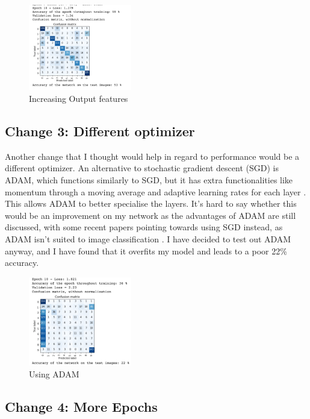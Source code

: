 \documentclass{article}
\begin{document}
    \begin{figure}[h!]
        \centering
        \includegraphics[width=0.4\textwidth]{bigger_output}
        \caption{Increasing Output features}
    \end{figure}

    \subsection{Change 3: Different optimizer}

    Another change that I thought would help in regard to performance would be a different optimizer. An alternative to stochastic gradient descent (SGD) is ADAM, which functions similarly to SGD, but it has extra functionalities like momentum through a moving average and adaptive learning rates for each layer \cite{adam}. This allows ADAM to better specialise the layers. It's hard to say whether this would be an improvement on my network as the advantages of ADAM are still discussed, with some recent papers pointing towards using SGD instead, as ADAM isn't suited to image classification \cite{adamvssgd}. I have decided to test out ADAM anyway, and I have found that it overfits my model and leads to a poor 22\% accuracy.

    \begin{figure}[h!]
        \centering
        \includegraphics[width=0.4\textwidth]{adam}
        \caption{Using ADAM}
    \end{figure}
    

    \subsection{Change 4: More Epochs}
\end{document}

